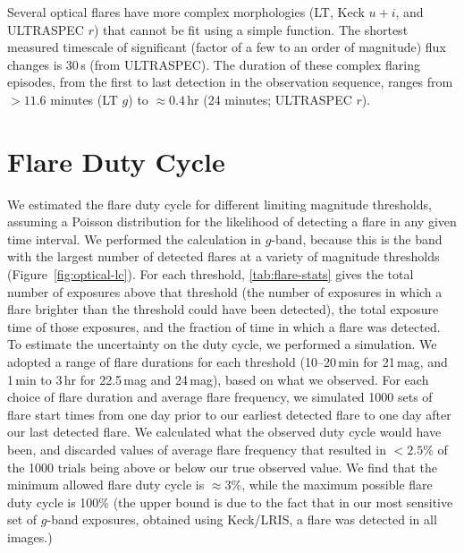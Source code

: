 \documentclass{nature_plusfigure}
\begin{document}
\begin{methods}
Several optical flares have more complex morphologies (LT, Keck $u+i$, and ULTRASPEC $r$) that cannot be fit using a simple function. The shortest measured timescale of significant (factor of a few to an order of magnitude) flux changes is 30\,s (from ULTRASPEC). The duration of these complex flaring episodes, from the first to last detection in the observation sequence, ranges from $>11.6$ minutes (LT $g$) to $\approx0.4\,$hr (24 minutes; ULTRASPEC $r$).


\section{Flare Duty Cycle}
\label{sec:flare-duty-cycle}

We estimated the flare duty cycle for different limiting magnitude thresholds, assuming a Poisson distribution for the likelihood of detecting a flare in any given time interval. We performed the calculation in $g$-band, because this is the band with the largest number of detected flares at a variety of magnitude thresholds (Figure~\ref{fig:optical-lc}). 
For each threshold, \ref{tab:flare-stats} gives the total number of exposures above that threshold (the number of exposures in which a flare brighter than the threshold could have been detected), the total exposure time of those exposures, and the fraction of time in which a flare was detected. To estimate the uncertainty on the duty cycle, we performed a simulation. We adopted a range of flare durations for each threshold (10--20\,min for 21\,mag, and 1\,min to 3\,hr for 22.5\,mag and 24\,mag), based on what we observed. For each choice of flare duration and average flare frequency, we simulated 1000 sets of flare start times from one day prior to our earliest detected flare to one day after our last detected flare. We calculated what the observed duty cycle would have been, and discarded values of average flare frequency that resulted in $<2.5\%$ of the 1000 trials being above or below our true observed value. We find that the minimum allowed flare duty cycle is $\approx3\%$, while the maximum possible flare duty cycle is 100\% (the upper bound is due to the fact that in our most sensitive set of $g$-band exposures, obtained using Keck/LRIS, a flare was detected in all images.) 


\end{methods}
\end{document}

